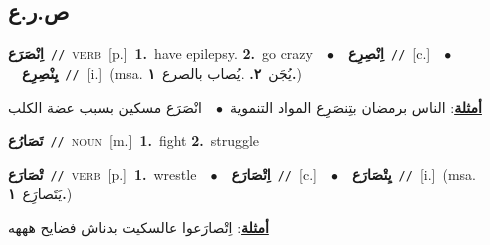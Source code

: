 \documentclass[10pt,a4paper,twoside]{article} %
\begin{document}
\begin{multicols}{2}
\vspace{-3mm}
\subsection*{\color{blue}\foreignlanguage{arabic}{ص.ر.ع}\color{blue}{}} 

{\setlength\topsep{0pt}\textbf{\foreignlanguage{arabic}{اِنْصَرَع}}\ {\color{gray}\texttt{//}\color{black}}\ \textsc{verb}\ [p.]\ \textbf{1.}~have epilepsy.  \textbf{2.}~go crazy\ \ $\bullet$\ \ \setlength\topsep{0pt}\textbf{\foreignlanguage{arabic}{اِنْصِرِع}}\ {\color{gray}\texttt{//}\color{black}}\ [c.]\ \ $\bullet$\ \ \setlength\topsep{0pt}\textbf{\foreignlanguage{arabic}{يِنْصِرِع}}\ {\color{gray}\texttt{//}\color{black}}\ [i.]\ \color{gray}(msa. \foreignlanguage{arabic}{يُجَن}~\foreignlanguage{arabic}{\textbf{٢.}}  .\foreignlanguage{arabic}{يُصاب بالصرع}~\foreignlanguage{arabic}{\textbf{١.}})\color{black}\  \begin{flushright}\color{gray}\foreignlanguage{arabic}{\textbf{\underline{\foreignlanguage{arabic}{أمثلة}}}: الناس برمضان بتِنصَرِع المواد التنموية\ $\bullet$\ \  انْصَرَع مسكين بسبب عضة الكلب}\end{flushright}\color{black}} \vspace{2mm}

{\setlength\topsep{0pt}\textbf{\foreignlanguage{arabic}{تَصَارُع}}\ {\color{gray}\texttt{//}\color{black}}\ \textsc{noun}\ [m.]\ \textbf{1.}~fight  \textbf{2.}~struggle\ } \vspace{2mm}

{\setlength\topsep{0pt}\textbf{\foreignlanguage{arabic}{تْصَارَع}}\ {\color{gray}\texttt{//}\color{black}}\ \textsc{verb}\ [p.]\ \textbf{1.}~wrestle\ \ $\bullet$\ \ \setlength\topsep{0pt}\textbf{\foreignlanguage{arabic}{اِتْصَارَع}}\ {\color{gray}\texttt{//}\color{black}}\ [c.]\ \ $\bullet$\ \ \setlength\topsep{0pt}\textbf{\foreignlanguage{arabic}{يِتْصَارَع}}\ {\color{gray}\texttt{//}\color{black}}\ [i.]\ \color{gray}(msa. \foreignlanguage{arabic}{يَتَصارَِع}~\foreignlanguage{arabic}{\textbf{١.}})\color{black}\  \begin{flushright}\color{gray}\foreignlanguage{arabic}{\textbf{\underline{\foreignlanguage{arabic}{أمثلة}}}: اِتْصارَعوا عالسكيت بدناش فضايح هههه}\end{flushright}\color{black}} \vspace{2mm}


\end{multicols}
\end{document}
